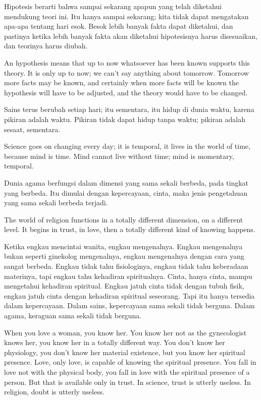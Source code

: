 \bahasa
Hipotesis berarti bahwa sampai sekarang apapun yang telah diketahui mendukung teori ini. Itu hanya sampai sekarang; kita tidak dapat mengatakan apa-apa tentang hari esok. Besok lebih banyak fakta dapat diketahui, dan pastinya ketika lebih banyak fakta akan diketahui hipotesisnya harus disesuaikan, dan teorinya harus diubah.

\english
An hypothesis means that up to now whatsoever has been known supports this theory. It is only up to now; we can't say anything about tomorrow. Tomorrow more facts may be known, and certainly when more facts will be known the hypothesis will have to be adjusted, and the theory would have to be changed.

\bahasa
Sains terus berubah setiap hari; itu sementara, itu hidup di dunia waktu, karena pikiran adalah waktu. Pikiran tidak dapat hidup tanpa waktu; pikiran adalah sesaat, sementara.

\english
Science goes on changing every day; it is temporal, it lives in the world of time, because mind is time. Mind cannot live without time; mind is momentary, temporal.

\bahasa
Dunia agama berfungsi dalam dimensi yang sama sekali berbeda, pada tingkat yang berbeda. Itu dimulai dengan kepercayaan, cinta, maka jenis pengetahuan yang sama sekali berbeda terjadi.

\english
The world of religion functions in a totally different dimension, on a different level. It begins in trust, in love, then a totally different kind of knowing happens.

\bahasa
Ketika engkau mencintai wanita, engkau mengenalnya. Engkau mengenalnya bukan seperti ginekolog mengenalnya, engkau mengenalnya dengan cara yang sangat berbeda. Engkau tidak tahu fisiologinya, engkau tidak tahu keberadaan materinya, tapi engkau tahu kehadiran spiritualnya. Cinta, hanya cinta, mampu mengetahui kehadiran spiritual. Engkau jatuh cinta tidak dengan tubuh fisik, engkau jatuh cinta dengan kehadiran spiritual seseorang. Tapi itu hanya tersedia dalam kepercayaan. Dalam sains, kepercayaan sama sekali tidak berguna. Dalam agama, keraguan sama sekali tidak berguna.

\english
When you love a woman, you know her. You know her not as the gynecologist knows
her, you know her in a totally different way. You don't know her physiology, you don't know her material existence, but you know her spiritual presence. Love, only love, is capable of knowing the spiritual presence. You fall in love not with the physical body, you fall in love with the spiritual presence of a person. But that is available only in trust. In science, trust is utterly useless. In religion, doubt is utterly useless.

